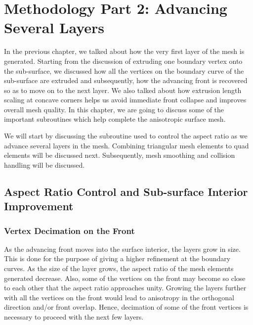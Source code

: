 \chapter{Methodology Part 2: Advancing Several Layers}

In the previous chapter, we talked about how the very first layer of the mesh is generated. Starting from the discussion of extruding one boundary vertex onto the sub-surface, we discussed how all the vertices on the boundary curve of the sub-surface are extruded and subsequently, how the advancing front is recovered so as to move on to the next layer. We also talked about how extrusion length scaling at concave corners helps us avoid immediate front collapse and improves overall mesh quality. In this chapter, we are going to discuss some of the important subroutines which help complete the anisotropic surface mesh.

We will start by discussing the subroutine used to control the aspect ratio as we advance several layers in the mesh. Combining triangular mesh elements to quad elements will be discussed next. Subsequently, mesh smoothing and collision handling will be discussed.

\section{Aspect Ratio Control and Sub-surface Interior Improvement}

\subsection{Vertex Decimation on the Front}
\label{aspectRatioControl}

As the advancing front moves into the surface interior, the layers grow in size. This is done for the purpose of giving a higher refinement at the boundary curves. As the size of the layer grows, the aspect ratio of the mesh elements generated decrease. Also, some of the vertices on the front may become so close to each other that the aspect ratio approaches unity. Growing the layers further with all the vertices on the front would lead to anisotropy in the orthogonal direction  and/or front overlap. Hence, decimation of some of the front vertices is necessary to proceed with the next few layers.

